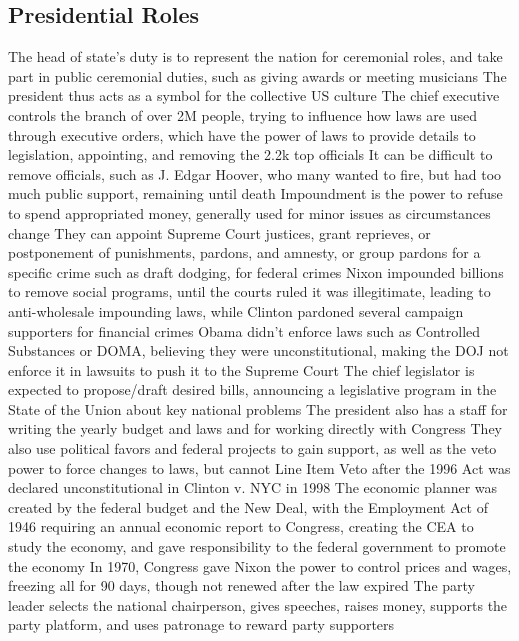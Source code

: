 \documentclass[11 pt, twoside]{article}
\newenvironment{outline*}
{
	\begin{outline}[enumerate]
	}
	{\end{outline}
}
\begin{document}
\subsection{Presidential Roles}
\begin{outline*}
\1 The head of state’s duty is to represent the nation for ceremonial roles, and take part in public ceremonial duties, such as giving awards or meeting musicians
\2 The president thus acts as a symbol for the collective US culture
\1 The chief executive controls the branch of over 2M people, trying to influence how laws are used through executive orders, which have the power of laws to provide details to legislation, appointing, and removing the 2.2k top officials
\2 It can be difficult to remove officials, such as J. Edgar Hoover, who many wanted to fire, but had too much public support, remaining until death
\2 Impoundment is the power to refuse to spend appropriated money, generally used for minor issues as circumstances change
\2 They can appoint Supreme Court justices, grant reprieves, or postponement of punishments, pardons, and amnesty, or group pardons for a specific crime such as draft dodging, for federal crimes
\2 Nixon impounded billions to remove social programs, until the courts ruled it was illegitimate, leading to anti-wholesale impounding laws, while Clinton pardoned several campaign supporters for financial crimes
\2 Obama didn’t enforce laws such as Controlled Substances or DOMA, believing they were unconstitutional, making the DOJ not enforce it in lawsuits to push it to the Supreme Court
\1 The chief legislator is expected to propose/draft desired bills, announcing a legislative program in the State of the Union about key national problems
\2 The president also has a staff for writing the yearly budget and laws and for working directly with Congress
\2 They also use political favors and federal projects to gain support, as well as the veto power to force changes to laws, but cannot Line Item Veto after the 1996 Act was declared unconstitutional in Clinton v. NYC in 1998
\1 The economic planner was created by the federal budget and the New Deal, with the Employment Act of 1946 requiring an annual economic report to Congress, creating the CEA to study the economy, and gave responsibility to the federal government to promote the economy
\2 In 1970, Congress gave Nixon the power to control prices and wages, freezing all for 90 days, though not renewed after the law expired
\1 The party leader selects the national chairperson, gives speeches, raises money, supports the party platform, and uses patronage to reward party supporters

\end{outline*}
\end{document}
